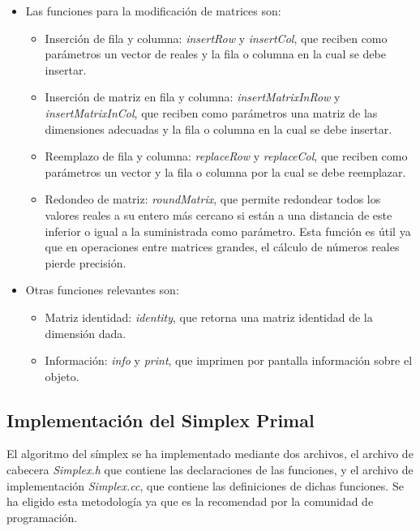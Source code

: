 \documentclass[12pt, titlepage]{article}
\begin{document}
\begin{itemize}
\item	Las funciones para la modificación de matrices son:
\begin{itemize}
\item	Inserción de fila y columna: \textit{insertRow} y \textit{insertCol}, que reciben como parámetros un vector de reales y la fila o columna en la cual se debe insertar.
\item	Inserción de matriz en fila y columna: \textit{insertMatrixInRow} y \textit{insertMatrixInCol}, que reciben como parámetros una matriz de las dimensiones adecuadas y la fila o columna en la cual se debe insertar.
\item	Reemplazo de fila y columna: \textit{replaceRow} y \textit{replaceCol}, que reciben como parámetros un vector y la fila o columna por la cual se debe reemplazar.
\item	Redondeo de matriz: \textit{roundMatrix}, que permite redondear todos los valores reales a su entero más cercano si están a una distancia de este inferior o igual a la suministrada como parámetro. Esta función es útil ya que en operaciones entre matrices grandes, el cálculo de números reales pierde precisión.
\end{itemize}
\item	Otras funciones relevantes son:
\begin{itemize}
\item	Matriz identidad: \textit{identity}, que retorna una matriz identidad de la dimensión dada.
\item	Información: \textit{info} y \textit{print}, que imprimen por pantalla información sobre el objeto.
\end{itemize}
\end{itemize}
\subsection{Implementación del Simplex Primal}
El algoritmo del símplex se ha implementado mediante dos archivos, el archivo de cabecera \textit{Simplex.h} que contiene las declaraciones de las funciones, y el archivo de implementación \textit{Simplex.cc}, que contiene las definiciones de dichas funciones. Se ha eligido esta metodología ya que es la recomendad por la comunidad de programación.\\
\end{document}
